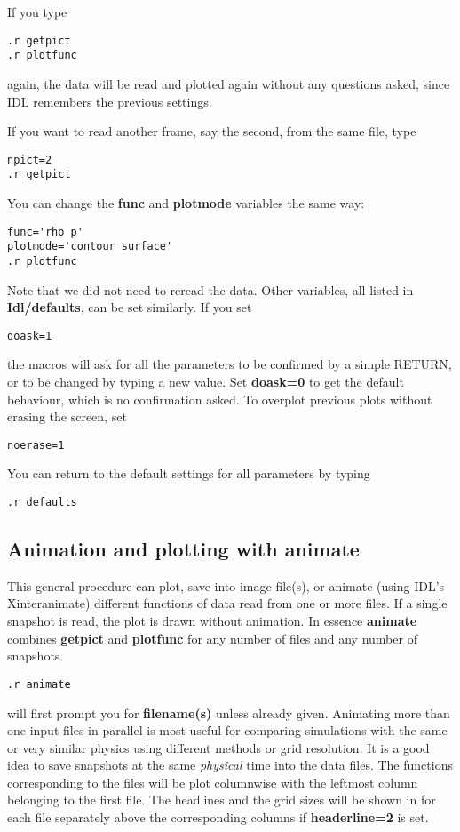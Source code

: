    If you type
\begin{verbatim}
.r getpict
.r plotfunc
\end{verbatim}
   again, the data will be read and plotted again without any questions asked,
   since IDL remembers the previous settings. 

   If you want to read another frame, say the second, from the same file, type
\begin{verbatim}
npict=2
.r getpict
\end{verbatim}
   You can change the {\bf func} and {\bf plotmode} variables the same way:
\begin{verbatim}
func='rho p'
plotmode='contour surface'
.r plotfunc
\end{verbatim}
   Note that we did not need to reread the data.
   Other variables, all listed in {\bf Idl/defaults}, can be set similarly.
   If you set
\begin{verbatim}
doask=1
\end{verbatim}
   the macros will ask for all the parameters to be confirmed by a simple
   RETURN, or to be changed by typing a new value. Set {\bf doask=0} to
   get the default behaviour, which is no confirmation asked.
   To overplot previous plots without erasing the screen, set
\begin{verbatim}
noerase=1
\end{verbatim}
   You can return to the default settings for all parameters by typing
\begin{verbatim}
.r defaults
\end{verbatim}

\subsection{Animation and plotting with animate \label{s-animate}}

   This general procedure can plot, save into image file(s), or animate 
   (using IDL's Xinteranimate) different functions of data 
   read from one or more files. If a single snapshot is read, the
   plot is drawn without animation. In essence {\bf animate} combines
   {\bf getpict} and {\bf plotfunc} for any number of files and any number 
   of snapshots.
\begin{verbatim}
.r animate
\end{verbatim}
   will first prompt you for {\bf filename(s)} unless already given. 
   Animating more than one input files in parallel is
   most useful for comparing simulations with the same or very similar physics
   using different methods or grid resolution. It is a good idea to save 
   snapshots at the same {\it physical} time into the data files.
   The functions corresponding to the files will be plot columnwise
   with the leftmost column belonging to the first file.
   The headlines and the grid sizes will be shown in 
   for each file separately above the corresponding columns
   if {\bf headerline=2} is set.

